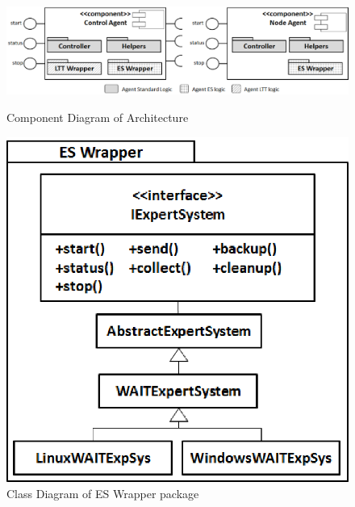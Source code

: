 \documentclass[runningheads,a4paper]{llncs}
\begin{document}
\begin{figure}
\centering
\begin{minipage}[b]{.67\textwidth}

\centering
\includegraphics[totalheight=.24\textheight,width=1.0\textwidth]{Components}
\caption{Component Diagram of Architecture}
\label{fig_components}

\end{minipage}\qquad
\begin{minipage}[b]{.27\textwidth}

\centering
\includegraphics[totalheight=.24\textheight,width=1.0\textwidth]{Wrapper}
\caption{Class Diagram of ES Wrapper package}
\label{fig_wrapper}

\end{minipage}
\end{figure}
\end{document}
